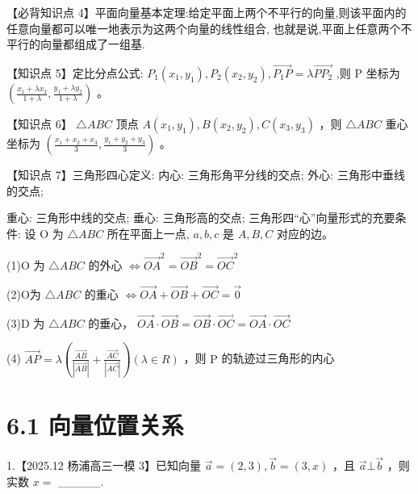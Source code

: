\documentclass[10pt]{article}
\begin{document}
【必背知识点 4】平面向量基本定理:给定平面上两个不平行的向量,则该平面内的任意向量都可以唯一地表示为这两个向量的线性组合, 也就是说,平面上任意两个不平行的向量都组成了一组基.

【知识点 5】定比分点公式: \({P}_{1}\left( {{x}_{1},{y}_{1}}\right) ,{P}_{2}\left( {{x}_{2},{y}_{2}}\right) ,\overrightarrow{{P}_{1}P} = \lambda \overrightarrow{P{P}_{2}}\) ,则 \(\mathrm{P}\) 坐标为 \(\left( {\frac{{x}_{1} + \lambda {x}_{2}}{1 + \lambda },\frac{{y}_{1} + \lambda {y}_{2}}{1 + \lambda }}\right)\) 。

【知识点 6】 \(\bigtriangleup {ABC}\) 顶点 \(A\left( {{x}_{1},{y}_{1}}\right) ,B\left( {{x}_{2},{y}_{2}}\right) ,C\left( {{x}_{3},{y}_{3}}\right)\) ，则 \(\bigtriangleup {ABC}\) 重心坐标为 \(\left( {\frac{{x}_{1} + {x}_{2} + {x}_{3}}{3},\frac{{y}_{1} + {y}_{2} + {y}_{3}}{3}}\right)\) 。

【知识点 7】三角形四心定义: 内心: 三角形角平分线的交点; 外心: 三角形中垂线的交点;

重心: 三角形中线的交点; 垂心: 三角形高的交点; 三角形四“心”向量形式的充要条件: 设 \(\mathrm{O}\) 为 \(\bigtriangleup {ABC}\) 所在平面上一点, \(a,b,c\) 是 \(A,B,C\) 对应的边。

(1)O 为 \(\bigtriangleup {ABC}\) 的外心 \(\Leftrightarrow  {\overrightarrow{OA}}^{2} = {\overrightarrow{OB}}^{2} = {\overrightarrow{OC}}^{2}\)

(2)O为 \(\bigtriangleup {ABC}\) 的重心 \(\Leftrightarrow  \overrightarrow{OA} + \overrightarrow{OB} + \overrightarrow{OC} = \overrightarrow{0}\)

(3)D 为 \(\bigtriangleup  {ABC}\) 的垂心， \(\overrightarrow{OA} \cdot  \overrightarrow{OB} = \overrightarrow{OB} \cdot  \overrightarrow{OC} = \overrightarrow{OA} \cdot  \overrightarrow{OC}\)

(4) \(\overrightarrow{AP} = \lambda \left( {\frac{\overrightarrow{AB}}{\left| \overrightarrow{AB}\right| } + \frac{\overrightarrow{AC}}{\left| \overrightarrow{AC}\right| }}\right) \left( {\lambda  \in  R}\right)\) ，则 \(\mathrm{P}\) 的轨迹过三角形的内心

\section*{6.1 向量位置关系}

1.【2025.12 杨浦高三一模 3】已知向量 \(\overrightarrow{a} = \left( {2,3}\right) ,\overrightarrow{b} = \left( {3,x}\right)\) ，且 \(\overrightarrow{a} \bot  \overrightarrow{b}\) ，则实数 \(x =\) \_\_\_\_\_.
\end{document}
